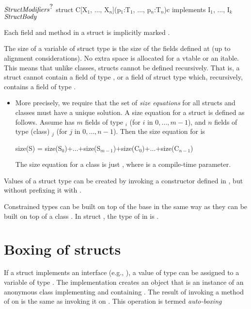 \begin{xtenmath}
$\mbox{\emph{StructModifiers}}^{\mbox{?}}$
struct C[X$_1$, $\ldots$, X$_n$](p$_1$:T$_1$, $\ldots$, p$_n$:T$_n$){c} 
   implements I$_1$, $\ldots$, I$_k$ {
$\mbox{\emph{StructBody}}$
}
\end{xtenmath}

Each field and method in a struct is implicitly marked .  

The size of a variable of struct type  is the size of the fields
defined at  (up to alignment considerations). No extra space is
allocated for a vtable or an itable. This means that unlike classes,
structs cannot be defined recursively. That is, a struct  cannot
contain a field of type , or a field of struct type  which,
recursively, contains a field of type .

\begin{itemize}
\item More precisely, we require that the set of \emph{size equations}
  for all structs and classes must have a unique solution. A size
  equation for a struct  is defined as follows. Assume  has $m$ fields
  of type $_i$ (for $i$ in $0,\ldots,m-1$), and $n$ fields of type (class) $_j$
  (for $j$ in $0,\ldots,n-1$). Then the size equation for  is 
\begin{xtenmath}
size(S) = size(S$_0$)+$\ldots$+size(S$_{m-1}$)+size(C$_0$)+$\ldots$+size(C$_{n-1}$) 
\end{xtenmath}
The size
equation for a class  is just , where
 is a compile-time parameter.
\end{itemize}

Values of a struct  type can be created by invoking a constructor
defined in , but without prefixing it with .

Constrained types can be built on top of the base  in the same way as
they can be built on top of a class . In struct ,
the type of  in  is .

\section{Boxing of structs}
If a struct  implements an interface  (e.g., ),
a value  of type  can be assigned to a variable of type
. The implementation creates an object  that is an
instance of an anonymous class implementing  and containing
.  The result of invoking a method of  on  is the
same as invoking it on . This operation is termed {\em auto-boxing}
\label{auto-boxing}

